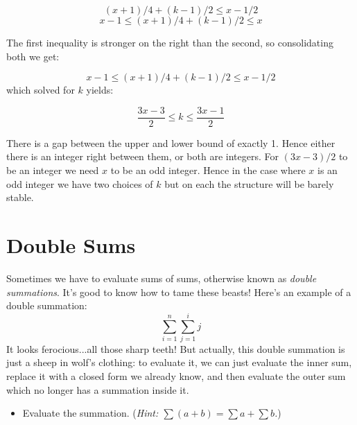 \documentclass[12pt]{article}
\begin{document}
{$$(x + 1)/4 + (k-1)/2 \leq  x - 1/2$$
$$ x - 1 \leq (x+1)/4 + (k-1)/2 \leq x$$

The first inequality is stronger on the right than the second, so consolidating both we get:

$$ x - 1 \leq  (x+1)/4 + (k-1)/2 \leq x - 1/2$$ which solved for $k$ yields:

$$\dfrac{3x - 3}{2} \leq k \leq \dfrac{3x- 1}{2}$$

There is a gap between the upper and lower bound of exactly 1. Hence either there is an integer right between them, or both are integers. For $(3x-3)/2$ to be an integer we need $x$ to be an odd integer.  Hence in the case where $x$ is an odd integer we have two choices of $k$ but on each the structure will be barely stable.

}
\newpage

\section{Double Sums}

Sometimes we have to evaluate sums of sums, otherwise known as
\emph{double summations}. It's good to know how to tame these beasts!
Here's an example of a double summation:
\[
\sum_{i=1}^n \sum_{j=1}^i j
\]
It looks ferocious...all those sharp teeth! But actually, this double
summation is just a sheep in wolf's clothing: to evaluate it, we can
just evaluate the inner sum, replace it with a closed form we already
know, and then evaluate the outer sum which no longer has a summation
inside it.

\begin{itemize}
\item Evaluate the summation. (\textit{Hint: $\sum(a+b)=\sum a + \sum b$.})

\end{itemize}
\end{document}
